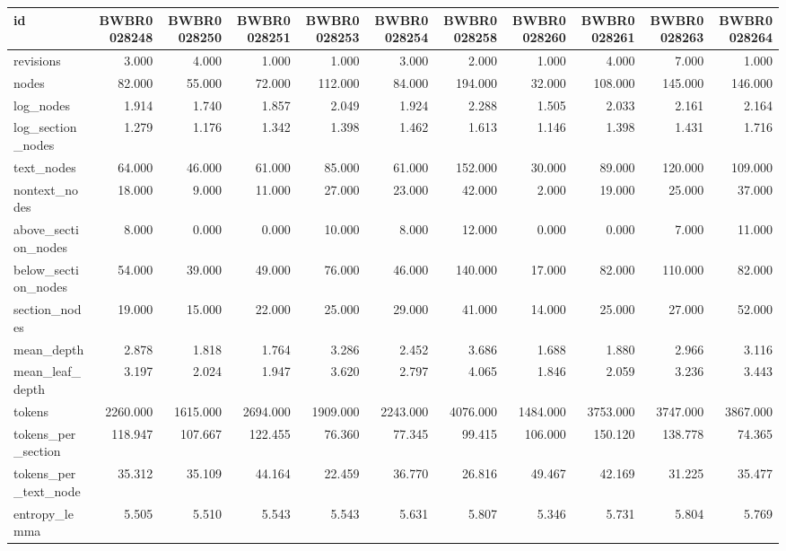 \begin{tabular}{lrrrrrrrrrr}
\toprule
id & BWBR0028248 & BWBR0028250 & BWBR0028251 & BWBR0028253 & BWBR0028254 & BWBR0028258 & BWBR0028260 & BWBR0028261 & BWBR0028263 & BWBR0028264 \\
\midrule
revisions & 3.000 & 4.000 & 1.000 & 1.000 & 3.000 & 2.000 & 1.000 & 4.000 & 7.000 & 1.000 \\
\cline{1-11}
nodes & 82.000 & 55.000 & 72.000 & 112.000 & 84.000 & 194.000 & 32.000 & 108.000 & 145.000 & 146.000 \\
\cline{1-11}
log\_nodes & 1.914 & 1.740 & 1.857 & 2.049 & 1.924 & 2.288 & 1.505 & 2.033 & 2.161 & 2.164 \\
\cline{1-11}
log\_section\_nodes & 1.279 & 1.176 & 1.342 & 1.398 & 1.462 & 1.613 & 1.146 & 1.398 & 1.431 & 1.716 \\
\cline{1-11}
text\_nodes & 64.000 & 46.000 & 61.000 & 85.000 & 61.000 & 152.000 & 30.000 & 89.000 & 120.000 & 109.000 \\
\cline{1-11}
nontext\_nodes & 18.000 & 9.000 & 11.000 & 27.000 & 23.000 & 42.000 & 2.000 & 19.000 & 25.000 & 37.000 \\
\cline{1-11}
above\_section\_nodes & 8.000 & 0.000 & 0.000 & 10.000 & 8.000 & 12.000 & 0.000 & 0.000 & 7.000 & 11.000 \\
\cline{1-11}
below\_section\_nodes & 54.000 & 39.000 & 49.000 & 76.000 & 46.000 & 140.000 & 17.000 & 82.000 & 110.000 & 82.000 \\
\cline{1-11}
section\_nodes & 19.000 & 15.000 & 22.000 & 25.000 & 29.000 & 41.000 & 14.000 & 25.000 & 27.000 & 52.000 \\
\cline{1-11}
mean\_depth & 2.878 & 1.818 & 1.764 & 3.286 & 2.452 & 3.686 & 1.688 & 1.880 & 2.966 & 3.116 \\
\cline{1-11}
mean\_leaf\_depth & 3.197 & 2.024 & 1.947 & 3.620 & 2.797 & 4.065 & 1.846 & 2.059 & 3.236 & 3.443 \\
\cline{1-11}
tokens & 2260.000 & 1615.000 & 2694.000 & 1909.000 & 2243.000 & 4076.000 & 1484.000 & 3753.000 & 3747.000 & 3867.000 \\
\cline{1-11}
tokens\_per\_section & 118.947 & 107.667 & 122.455 & 76.360 & 77.345 & 99.415 & 106.000 & 150.120 & 138.778 & 74.365 \\
\cline{1-11}
tokens\_per\_text\_node & 35.312 & 35.109 & 44.164 & 22.459 & 36.770 & 26.816 & 49.467 & 42.169 & 31.225 & 35.477 \\
\cline{1-11}
entropy\_lemma & 5.505 & 5.510 & 5.543 & 5.543 & 5.631 & 5.807 & 5.346 & 5.731 & 5.804 & 5.769 \\

\end{tabular}
